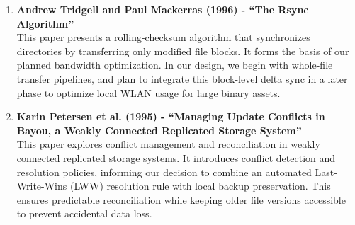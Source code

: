 \begin{enumerate}
    \item \textbf{Andrew Tridgell and Paul Mackerras (1996) - ``The Rsync Algorithm''} \cite{rsync1996} \\
    This paper presents a rolling-checksum algorithm that synchronizes directories by transferring only modified file blocks. It forms the basis of our planned bandwidth optimization. In our design, we begin with whole-file transfer pipelines, and plan to integrate this block-level delta sync in a later phase to optimize local WLAN usage for large binary assets.

    \item \textbf{Karin Petersen et al. (1995) - ``Managing Update Conflicts in Bayou, a Weakly Connected Replicated Storage System''} \cite{bayou1995} \\
    This paper explores conflict management and reconciliation in weakly connected replicated storage systems. It introduces conflict detection and resolution policies, informing our decision to combine an automated Last-Write-Wins (LWW) resolution rule with local backup preservation. This ensures predictable reconciliation while keeping older file versions accessible to prevent accidental data loss.
\end{enumerate}

